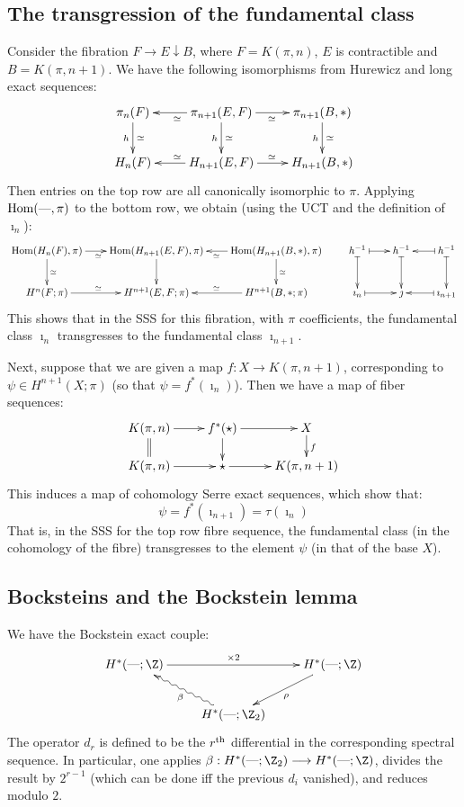 \documentclass[11pt]{article}
\begin{document}
{\setcounter{subsection}{1}
\subsection{The transgression of the fundamental class}
Consider  the fibration $F\rightarrow E\downarrow B$, where $F=K(\pi,n)$, $E$ is contractible and $B=K(\pi,n+1)$. We have the following isomorphisms from Hurewicz and long exact sequences:%
\[\xymatrix{
\pi_n(F)\ar[d]_h^\simeq&\pi_{n+1}(E,F)\ar[d]_h^\simeq\ar[l]^\simeq\ar[r]_\simeq&\pi_{n+1}(B,*)\ar[d]_h^\simeq\\
H_n(F)&H_{n+1}(E,F)\ar[l]_\simeq\ar[r]^\simeq&H_{n+1}(B,*)
}\]
Then entries on the top row are all canonically isomorphic to $\pi$. Applying $\operatorname{Hom}(\textup{---},\pi)$ to the bottom row, we obtain (using the UCT and the definition of $\imath_n$):
\[\xymatrix@C=.7cm{
\Hom(H_n(F),\pi)\ar[d]^\simeq\ar[r]_{\simeq\ \ }&
\Hom(H_{n+1}(E,F),\pi)\ar[d]&
\Hom(H_{n+1}(B,*),\pi)\ar[d]^\simeq\ar[l]^\simeq&
h^{-1}\ar@{|->}[r]\ar@{|->}[d]&
h^{-1}\ar@{|->}[d]&
h^{-1}\ar@{|->}[l]\ar@{|->}[d]\\
H^n(F;\pi)\ar[r]^{\simeq\ \ }&H^{n+1}(E,F;\pi)&H^{n+1}(B,*;\pi)\ar[l]_\simeq&
\imath_n\ar@{|->}[r]&\jmath&\imath_{n+1}\ar@{|->}[l]
}\]
This shows that in the SSS for this fibration, with $\pi$ coefficients, the fundamental class $\imath_n$ transgresses to the fundamental class $\imath_{n+1}$.

Next, suppose that we are given a map $f:X\to K(\pi,n+1)$, corresponding to $\psi\in H^{n+1}(X;\pi)$ (so that $\psi=f^*(\imath_n)$). Then we have a map of fiber sequences:
\[\xymatrix@R=5mm{
K(\pi,n)\ar[r]\ar@{=}[d]&f^*(\star)\ar[d]\ar[r]&X\ar[d]^f\\
K(\pi,n)\ar[r]&\star\ar[r]&K(\pi,n+1)
}\]
This induces a map of cohomology Serre exact sequences, which show that:
\begin{equation*}
\tag{Formula 1}\psi=f^*(\imath_{n+1})=\tau(\imath_n)
\end{equation*}
That is, in the SSS for the top row fibre sequence, the fundamental class (in the cohomology of the fibre) transgresses to the element $\psi$ (in that of the base $X$).

\subsection{Bocksteins and the Bockstein lemma}
We have the Bockstein exact couple:
\[\xymatrix{
H^*(\DASH;\Z)\ar[rr]^{\times2}&&H^*(\DASH;\Z)\ar[dl]^\rho\\
&H^*(\DASH;\Z_2)\ar@{~>}[ul]^{\beta}
}\]
The operator $d_r$ is defined to be the $r^\textup{th}$ differential in the corresponding spectral sequence. In particular, one applies $\beta:H^*(\DASH;\Z_2)\to H^*(\DASH;\Z)$, divides the result by $2^{r-1}$ (which can be done iff the previous $d_i$ vanished), and reduces modulo $2$.

}
\end{document}
